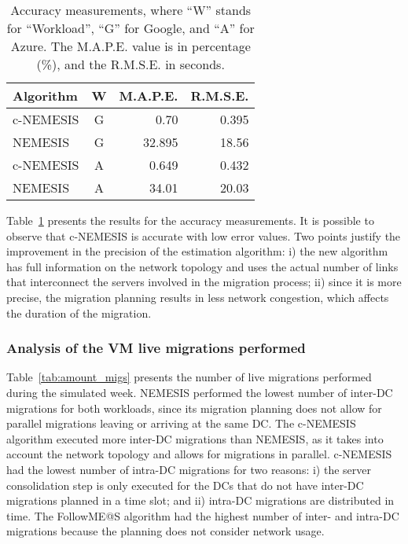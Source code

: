 \begin{table}[h]
  \caption{Accuracy measurements, where ``W'' stands for ``Workload'', ``G'' for Google, and ``A'' for Azure. The M.A.P.E. value is in percentage (\%), and the R.M.S.E. in seconds. }\label{tab:accuracy} \centering
\begin{tabular}{|l|c|r|r|}
  \hline
  \textbf{Algorithm} & \textbf{W}  & \textbf{M.A.P.E.} & \textbf{R.M.S.E.}\\
  \hline
  c-NEMESIS  & G & 0.70  & 0.395 \\
  \hline
  NEMESIS & G & 32.895 & 18.56 \\
  \hline
  c-NEMESIS  & A & 0.649  & 0.432 \\
  \hline
  NEMESIS & A & 34.01 & 20.03 \\
  \hline
\end{tabular}
\end{table}



Table~\ref{tab:accuracy} presents the results for the accuracy measurements. It is possible to observe that c-NEMESIS is accurate with low error values. Two points justify the improvement in the precision of the estimation algorithm: i) the new algorithm has full information on the network topology and uses the actual number of links that interconnect the servers involved in the migration process; ii) since it is more precise, the migration planning results in less network congestion, which affects the duration of the migration.


\subsubsection{Analysis of the VM live migrations performed}
\label{sec:analysis_vms_migs_smargreens}

Table~\ref{tab:amount_migs} presents the number of live migrations performed during the simulated week. NEMESIS performed the lowest number of inter-DC migrations for both workloads, since its migration planning does not allow for parallel migrations leaving or arriving at the same DC. The c-NEMESIS algorithm executed more inter-DC migrations than NEMESIS, as it takes into account the network topology and allows for migrations in parallel. c-NEMESIS had the lowest number of intra-DC migrations for two reasons: i) the server consolidation step is only executed for the DCs that do not have inter-DC migrations planned in a time slot; and ii) intra-DC migrations are distributed in time. The FollowME@S algorithm had the highest number of inter- and intra-DC migrations because the planning does not consider network usage.

